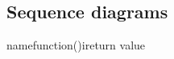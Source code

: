 \documentclass[Main]{subfiles}
\begin{document}
\subsection{Sequence diagrams}

\begin {sequencediagram}

\begin{call}{name}{function()}{i}{return value}
\end{call}

\end {sequencediagram}
\end{document}
